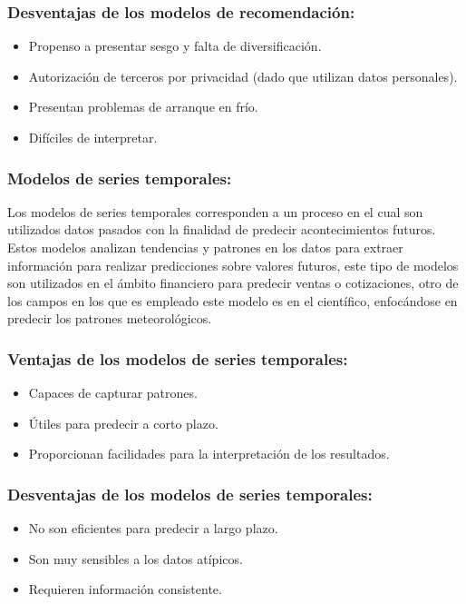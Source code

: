 \subsubsection{Desventajas de los modelos de recomendación:}
\begin{itemize}
    \item Propenso a presentar sesgo y falta de diversificación.
    \item Autorización de terceros por privacidad (dado que utilizan datos personales).
    \item Presentan problemas de arranque en frío.
    \item Difíciles de interpretar.
\end{itemize}

\subsubsection{Modelos de series temporales:}
 
Los modelos de series temporales corresponden a un proceso en el cual son utilizados datos pasados con la finalidad de predecir acontecimientos futuros. Estos modelos analizan tendencias y patrones en los datos para extraer información para realizar predicciones sobre valores futuros, este tipo de modelos son utilizados en el ámbito financiero para predecir ventas o cotizaciones, otro de los campos en los que es empleado este modelo es en el científico, enfocándose en predecir los patrones meteorológicos. 

\subsubsection{Ventajas de los modelos de series temporales:}
\begin{itemize}
    \item Capaces de capturar patrones.
    \item Útiles para predecir a corto plazo.
    \item Proporcionan facilidades para la interpretación de los resultados.
\end{itemize}

\subsubsection{Desventajas de los modelos de series temporales:}
\begin{itemize}
    \item No son eficientes para predecir a largo plazo.
    \item Son muy sensibles a los datos atípicos.
    \item Requieren información consistente.
\end{itemize}

